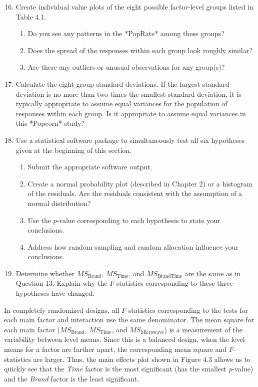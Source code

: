\documentclass[
]{report}
\begin{document}
\begin{enumerate}
  \setcounter{enumi}{15}

\item Create individual value plots of the eight possible factor-level groups listed in Table 4.1.

\begin{enumerate}
   \item Do you see any patterns in the *PopRate* among these groups?
   \item Does the spread of the responses within each group look roughly similar?
   \item Are there any outliers or unusual observations for any group(s)?
\end{enumerate}

\item Calculate the eight group standard deviations. If the largest standard deviation is no more than two times the smallest standard deviation, it is typically appropriate to assume equal variances for the population of responses within each group. Is it appropriate to assume equal variances in this *Popcorn* study?

\item Use a statistical software package to simultaneously test all six hypotheses given at the beginning of this section.
\begin{enumerate}
 \item Submit the appropriate software output.
 \item Create a normal probability plot (described in Chapter 2) or a histogram of the residuals. Are the residuals consistent with the assumption of a normal distribution?
 \item Use the $\scriptstyle p$-value corresponding to each hypothesis to state your conclusions.
 \item Address how random sampling and random allocation influence your conclusions.
\end{enumerate}

\item Determine whether $\scriptstyle MS_{\text{Brand}}$, $\scriptstyle MS_{\text{Time}}$, and $\scriptstyle MS_{\text{BrandTime}}$ are the same as in Question 13. Explain why the $\scriptstyle F$-statistics corresponding to these three hypotheses have changed.
\end{enumerate}

In completely randomized designs, all \(\scriptstyle F\)-statistics corresponding to the tests for each main factor and interaction use the same denominator. The mean square for each main factor (\(\scriptstyle MS_{\text{Brand}}\), \(\scriptstyle MS_{\text{Time}}\), and \(\scriptstyle MS_{\text{Microwave}}\)) is a measurement of the variability between level means. Since this is a balanced design, when the level means for a factor are farther apart, the corresponding mean square and \(\scriptstyle F\)-statistics are larger. Thus, the main effects plot shown in Figure 4.3 allows us to quickly see that the \emph{Time} factor is the most significant (has the smallest \(\scriptstyle p\)-value) and the \emph{Brand} factor is the least significant.
\end{document}
